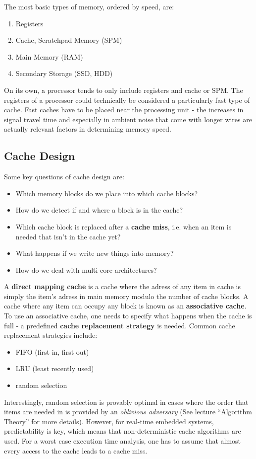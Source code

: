 \documentclass{report}
\newcommand{\tbf}{\textbf}
\newcommand*{\newpar}{\par\vspace{\baselineskip}\noindent} %
\begin{document}
\newpar
The most basic types of memory, ordered by speed, are:
\begin{enumerate}
 \item Registers
 \item Cache, Scratchpad Memory (SPM)
 \item Main Memory (RAM)
 \item Secondary Storage (SSD, HDD)
\end{enumerate}
On its own, a processor tends to only include registers and cache or SPM. The registers of a processor could technically be considered a particularly fast type of cache. Fast caches have to be placed near the processing unit - the increases in signal travel time and especially in ambient noise that come with longer wires are actually relevant factors in determining memory speed.
%
\subsection{Cache Design}
Some key questions of cache design are:
\begin{itemize}
 \item Which memory blocks do we place into which cache blocks?
 \item How do we detect if and where a block is in the cache?
 \item Which cache block is replaced after a \tbf{cache miss}, i.e. when an item is needed that isn't in the cache yet?
 \item What happens if we write new things into memory?
 \item How do we deal with multi-core architectures?
\end{itemize}
A \tbf{direct mapping cache} is a cache where the adress of any item in cache is simply the item's adress in main memory modulo the number of cache blocks. A cache where any item can occupy any block is known as an \tbf{associative cache}. To use an associative cache, one needs to specify what happens when the cache is full - a predefined \tbf{cache replacement strategy} is needed. Common cache replacement strategies include:
\begin{itemize}
 \item FIFO (first in, first out)
 \item LRU (least recently used)
 \item random selection
\end{itemize}
Interestingly, random selection is provably optimal in cases where the order that items are needed in is provided by an \textit{oblivious adversary} (See lecture ``Algorithm Theory'' for more details). However, for real-time embedded systems, predictability is key, which means that non-deterministic cache algorithms are used. For a worst case execution time analysis, one has to assume that almost every access to the cache leads to a cache miss.
%
\clearpage
\end{document}

